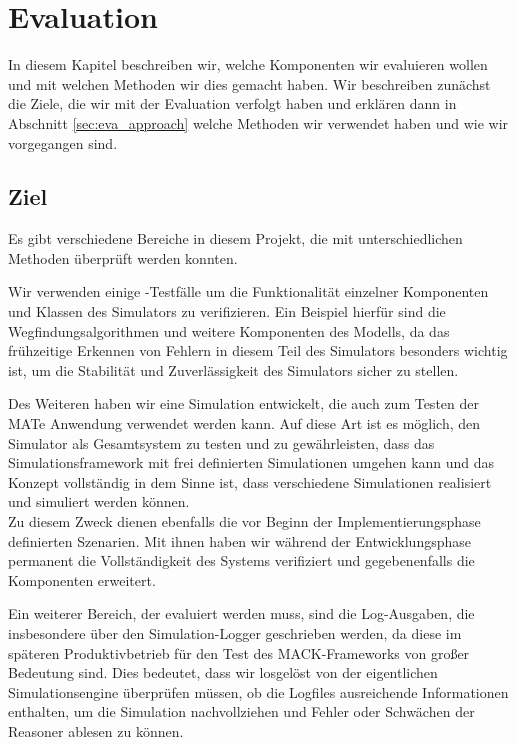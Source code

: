 \chapter{Evaluation}\label{chapter:eval}
In diesem Kapitel beschreiben wir, welche Komponenten wir evaluieren wollen und mit welchen Methoden wir dies gemacht haben. Wir beschreiben zunächst die Ziele, die wir mit der Evaluation verfolgt haben und erklären dann in Abschnitt \ref{sec:eva_approach} welche Methoden wir verwendet haben und wie wir vorgegangen sind.
\section{Ziel}\label{sec:eva_goal}
Es gibt verschiedene Bereiche in diesem Projekt, die mit unterschiedlichen Methoden überprüft werden konnten.

Wir verwenden einige -Testfälle um die Funktionalität einzelner Komponenten und Klassen des Simulators zu verifizieren. Ein Beispiel hierfür sind die Wegfindungsalgorithmen und weitere Komponenten des Modells, da das frühzeitige Erkennen von Fehlern in diesem Teil des Simulators besonders wichtig ist, um die Stabilität und Zuverlässigkeit des Simulators sicher zu stellen.

Des Weiteren haben wir eine Simulation entwickelt, die auch zum Testen der MATe Anwendung verwendet werden kann. Auf diese Art ist es möglich, den Simulator als Gesamtsystem zu testen und zu gewährleisten, dass das Simulationsframework mit frei definierten Simulationen umgehen kann und das Konzept vollständig in dem Sinne ist, dass verschiedene Simulationen realisiert und simuliert werden können.\\
Zu diesem Zweck dienen ebenfalls die vor Beginn der Implementierungsphase definierten Szenarien. Mit ihnen haben wir während der Entwicklungsphase permanent die Vollständigkeit des Systems verifiziert und gegebenenfalls die Komponenten erweitert.

Ein weiterer Bereich, der evaluiert werden muss, sind die Log-Ausgaben, die insbesondere über den Simulation-Logger geschrieben werden, da diese im späteren Produktivbetrieb für den Test des MACK-Frameworks von großer Bedeutung sind. Dies bedeutet, dass wir losgelöst von der eigentlichen Simulationsengine überprüfen müssen, ob die Logfiles ausreichende Informationen enthalten, um die Simulation nachvollziehen und Fehler oder Schwächen der Reasoner ablesen zu können.

